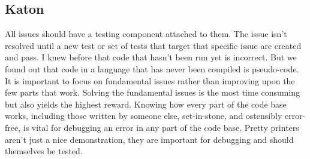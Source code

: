 \subsection{Katon}

All issues should have a testing component attached to them. The issue isn’t resolved until a new test or set of tests that target that specific issue are created and pass.
I knew before that code that hasn’t been run yet is incorrect. But we found out that code in a language that has never been compiled is pseudo-code.
It is important to focus on fundamental issues rather than improving upon the few parts that work. Solving the fundamental issues is the most time consuming but also yields the highest reward.
Knowing how every part of the code base works, including those written by someone else, set-in-stone, and ostensibly error-free, is vital for debugging an error in any part of the code base.
Pretty printers aren’t just a nice demonstration, they are important for debugging and should themselves be tested.
